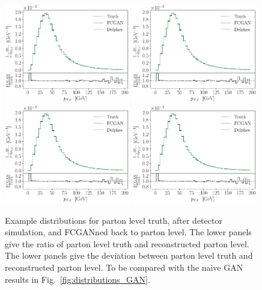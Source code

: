 
\begin{figure}[t]
\centering
\includegraphics[page = 2, width=0.49\textwidth]{figures/cGAN/cGAN_full_ratio}
\includegraphics[page = 3, width=0.49\textwidth]{figures/cGAN/cGAN_full_ratio} \\
\includegraphics[page = 1, width=0.49\textwidth]{figures/cGAN/cGAN_full_ratio}
\includegraphics[page = 4, width=0.49\textwidth]{figures/cGAN/cGAN_full_ratio}
\caption{Example distributions for parton level truth, after detector
  simulation, and FCGANned back to parton level. The lower panels give
  the ratio of parton level truth and reconstructed parton level.  The
  lower panels give the deviation between parton level truth and
  reconstructed parton level. To be compared with the naive GAN
  results in Fig.~\ref{fig:distributions_GAN}.}
\label{fig:distributions_FCGAN}
\end{figure}


